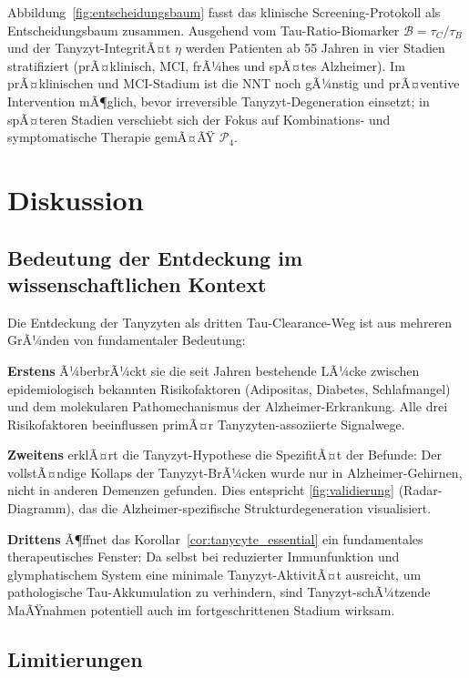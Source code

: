 ﻿\documentclass[12pt,a4paper]{article}
\theoremstyle{definition}
\begin{document}
	{\small Abbildung~\ref{fig:entscheidungsbaum} fasst das klinische Screening-Protokoll als Entscheidungsbaum zusammen. Ausgehend vom Tau-Ratio-Biomarker $\mathcal{B} = \tau_C/\tau_B$ und der Tanyzyt-IntegritÃ¤t $\eta$ werden Patienten ab 55 Jahren in vier Stadien stratifiziert (prÃ¤klinisch, MCI, frÃ¼hes und spÃ¤tes Alzheimer). Im prÃ¤klinischen und MCI-Stadium ist die NNT noch gÃ¼nstig und prÃ¤ventive Intervention mÃ¶glich, bevor irreversible Tanyzyt-Degeneration einsetzt; in spÃ¤teren Stadien verschiebt sich der Fokus auf Kombinations- und symptomatische Therapie gemÃ¤ÃŸ $\mathcal{P}_4$.}
	
	\section{Diskussion}
	
	\subsection{Bedeutung der Entdeckung im wissenschaftlichen Kontext}
	
	Die Entdeckung der Tanyzyten als dritten Tau-Clearance-Weg ist aus mehreren GrÃ¼nden von fundamentaler Bedeutung:
	
	\textbf{Erstens} Ã¼berbrÃ¼ckt sie die seit Jahren bestehende LÃ¼cke zwischen epidemiologisch bekannten Risikofaktoren (Adipositas, Diabetes, Schlafmangel) und dem molekularen Pathomechanismus der Alzheimer-Erkrankung. Alle drei Risikofaktoren beeinflussen primÃ¤r Tanyzyten-assoziierte Signalwege.
	
	\textbf{Zweitens} erklÃ¤rt die Tanyzyt-Hypothese die SpezifitÃ¤t der Befunde: Der vollstÃ¤ndige Kollaps der Tanyzyt-BrÃ¼cken wurde nur in Alzheimer-Gehirnen, nicht in anderen Demenzen gefunden. Dies entspricht \cref{fig:validierung} (Radar-Diagramm), das die Alzheimer-spezifische Strukturdegeneration visualisiert.
	
	\textbf{Drittens} Ã¶ffnet das Korollar~\ref{cor:tanycyte_essential} ein fundamentales therapeutisches Fenster: Da selbst bei reduzierter Immunfunktion und glymphatischem System eine minimale Tanyzyt-AktivitÃ¤t ausreicht, um pathologische Tau-Akkumulation zu verhindern, sind Tanyzyt-schÃ¼tzende MaÃŸnahmen potentiell auch im fortgeschrittenen Stadium wirksam.
	
	\subsection{Limitierungen}
	
\end{document}
